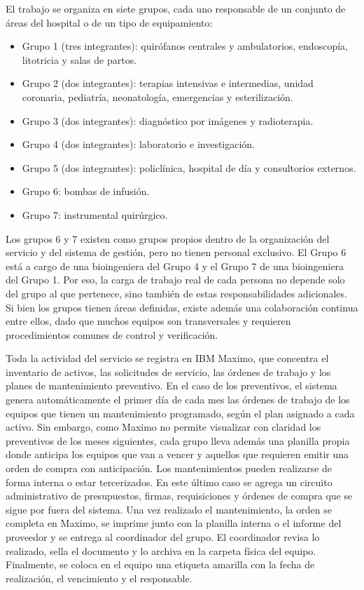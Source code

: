 \documentclass[10pt]{article}
\begin{document}
El trabajo se organiza en siete grupos, cada uno responsable de un conjunto de áreas del hospital o de un tipo de equipamiento:
\begin{itemize}
    \item Grupo 1 (tres integrantes): quirófanos centrales y ambulatorios, endoscopía, litotricia y salas de partos.
    \item Grupo 2 (dos integrantes): terapias intensivas e intermedias, unidad coronaria, pediatría, neonatología, emergencias y esterilización.
    \item Grupo 3 (dos integrantes): diagnóstico por imágenes y radioterapia.
    \item Grupo 4 (dos integrantes): laboratorio e investigación.
    \item Grupo 5 (dos integrantes): policlínica, hospital de día y consultorios externos.
    \item Grupo 6: bombas de infusión.
    \item Grupo 7: instrumental quirúrgico.
\end{itemize}
Los grupos 6 y 7 existen como grupos propios dentro de la organización del servicio y del sistema de gestión, pero no tienen personal exclusivo. El Grupo 6 está a cargo de una bioingeniera del Grupo 4 y el Grupo 7 de una bioingeniera del Grupo 1. Por eso, la carga de trabajo real de cada persona no depende solo del grupo al que pertenece, sino también de estas responsabilidades adicionales. Si bien los grupos tienen áreas definidas, existe además una colaboración continua entre ellos, dado que muchos equipos son transversales y requieren procedimientos comunes de control y verificación.

Toda la actividad del servicio se registra en IBM Maximo, que concentra el inventario de activos, las solicitudes de servicio, las órdenes de trabajo y los planes de mantenimiento preventivo. En el caso de los preventivos, el sistema genera automáticamente el primer día de cada mes las órdenes de trabajo de los equipos que tienen un mantenimiento programado, según el plan asignado a cada activo. Sin embargo, como Maximo no permite visualizar con claridad los preventivos de los meses siguientes, cada grupo lleva además una planilla propia donde anticipa los equipos que van a vencer y aquellos que requieren emitir una orden de compra con anticipación. Los mantenimientos pueden realizarse de forma interna o estar tercerizados. En este último caso se agrega un circuito administrativo de presupuestos, firmas, requisiciones y órdenes de compra que se sigue por fuera del sistema. Una vez realizado el mantenimiento, la orden se completa en Maximo, se imprime junto con la planilla interna o el informe del proveedor y se entrega al coordinador del grupo. El coordinador revisa lo realizado, sella el documento y lo archiva en la carpeta física del equipo. Finalmente, se coloca en el equipo una etiqueta amarilla con la fecha de realización, el vencimiento y el responsable.
\end{document}
